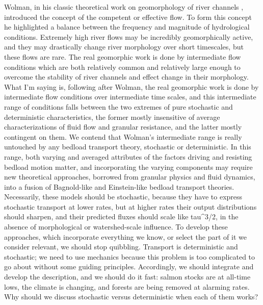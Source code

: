 \documentclass{article}
\begin{document}
Wolman, in his classic theoretical work on geomorphology of river channels \citep{Wolman1968}, introduced the concept of the competent or effective flow. 
To form this concept he highlighted a balance between the frequency and magnitude of hydrological conditions. 
Extremely high river flows may be incredibly geomorphically active, and they may drastically change river morphology over short timescales, but these flows are rare. 
The real geomorphic work is done by intermediate flow conditions which are both relatively common and relatively large enough to overcome the stability of river channels and effect change in their morphology. 
What I'm saying is, following after Wolman, the real geomorphic work is done by intermediate flow conditions over intermediate time scales, and this intermediate range of conditions falls between the two extremes of pure stochastic and deterministic characteristics, the former mostly insensitive of average characterizations of fluid flow and granular resistance, and the latter mostly contingent on them. 
We contend that Wolman's intermediate range is really untouched by any bedload transport theory, stochastic or deterministic.  
In this range, both varying and averaged attributes of the factors driving and resisting bedload motion matter, and incorporating the varying components may require new theoretical approaches, borrowed from granular physics and fluid dynamics, into a fusion of Bagnold-like and Einstein-like bedload transport theories.
Necessarily, these models should be stochastic, because they have to express stochastic transport at lower rates, but at higher rates their output distributions should sharpen, and their predicted fluxes should scale like tau^3/2, in the absence of morphological or watershed-scale influence. 
To develop these approaches, which incorporate everything we know, or select the part of it we consider relevant, we should stop quibbling. 
Transport is deterministic and stochastic; we need to use mechanics because this problem is too complicated to go about without some guiding principles. 
Accordingly, we should integrate and develop the description, and we should do it fast: salmon stocks are at all-time lows, the climate is changing, and forests are being removed at alarming rates. 
Why should we discuss stochastic versus deterministic when each of them works? 

  
\end{document}
